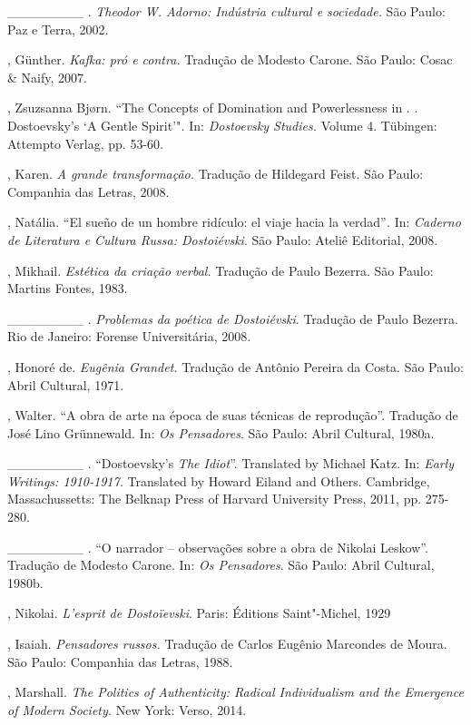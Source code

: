 \begin{Parskip}
\_\_\_\_\_\_\_\_ . \emph{Theodor W. Adorno: Indústria cultural e
sociedade.} São Paulo: Paz e Terra, 2002.

, Günther. \emph{Kafka: pró e contra.} Tradução de Modesto Carone.
São Paulo: Cosac \& Naify, 2007.

, Zsuzsanna Bjørn. ``The Concepts of Domination and
Powerlessness in . . Dostoevsky's `A Gentle Spirit'"\emph{.} In:
\emph{Dostoevsky Studies.} Volume 4. Tübingen: Attempto Verlag, pp.
53-60.

, Karen. \emph{A grande transformação.} Tradução de Hildegard
Feist. São Paulo: Companhia das Letras, 2008.

, Natália. ``El sueño de un hombre ridículo: el viaje hacia la
verdad''\emph{.} In: \emph{Caderno de Literatura e Cultura Russa:
Dostoiévski}. São Paulo: Ateliê Editorial, 2008.

, Mikhail. \emph{Estética da criação verbal.} Tradução de Paulo
Bezerra. São Paulo: Martins Fontes, 1983.

\_\_\_\_\_\_\_\_ . \emph{Problemas da poética de Dostoiévski}. Tradução
de Paulo Bezerra. Rio de Janeiro: Forense Universitária, 2008.

, Honoré de. \emph{Eugênia Grandet.} Tradução de Antônio Pereira
da Costa. São Paulo: Abril Cultural, 1971.

, Walter. ``A obra de arte na época de suas técnicas de
reprodução''. Tradução de José Lino Grünnewald. In: \emph{Os
Pensadores}. São Paulo: Abril Cultural, 1980a.

\_\_\_\_\_\_\_\_ . ``Dostoevsky's \emph{The Idiot}''. Translated by
Michael Katz. In: \emph{Early Writings: 1910-1917.} Translated by Howard
Eiland and Others. Cambridge, Massachussetts: The Belknap Press of
Harvard University Press, 2011, pp. 275-280.

\_\_\_\_\_\_\_\_ . ``O narrador -- observações sobre a obra de Nikolai
Leskow''. Tradução de Modesto Carone. In: \emph{Os Pensadores}. São
Paulo: Abril Cultural, 1980b.

, Nikolai. \emph{L'esprit de Dostoïevski}. Paris: Éditions
Saint"-Michel, 1929

, Isaiah. \emph{Pensadores russos.} Tradução de Carlos Eugênio
Marcondes de Moura. São Paulo: Companhia das Letras, 1988.

, Marshall. \emph{The Politics of Authenticity: Radical
Individualism and the Emergence of Modern Society.} New York: Verso,
2014.


\end{Parskip}
